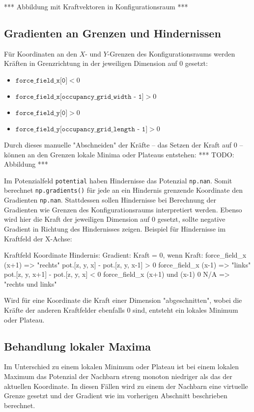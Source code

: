 *** Abbildung mit Kraftvektoren in Konfigurationsraum ***


\subsection{Gradienten an Grenzen und Hindernissen}

Für Koordinaten an den $X$- und $Y$-Grenzen des Konfigurationsraums werden Kräften in Grenzrichtung in der jeweiligen Dimension auf $0$ gesetzt:
\begin{itemize}
\item $\texttt{force\_field\_x[0]} < 0$
\item $\texttt{force\_field\_x[occupancy\_grid\_width - 1]} > 0$
\item $\texttt{force\_field\_y[0]} > 0$
\item $\texttt{force\_field\_y[occupancy\_grid\_length - 1]} > 0$
\end{itemize}

Durch dieses manuelle "Abschneiden" der Kräfte -- das Setzen der Kraft auf $0$ -- können an den Grenzen lokale Minima oder Plateaus entstehen:
	*** TODO: Abbildung ***

Im Potenzialfeld \texttt{potential} haben Hindernisse das Potenzial \texttt{np.nan}. Somit berechnet \texttt{np.gradients()} für jede an ein Hindernis grenzende Koordinate den Gradienten \texttt{np.nan}.
Stattdessen sollen Hindernisse bei Berechnung der Gradienten wie Grenzen des Konfigurationsraums interpretiert werden. Ebenso wird hier die Kraft der jeweiligen Dimension auf 0 gesetzt, sollte negative Gradient in Richtung des Hindernisses zeigen. Beispiel für Hindernisse im Kraftfeld der X-Achse:

Kraftfeld			Koordinate Hindernis:	Gradient: 								Kraft = 0, wenn Kraft:
force\_field\_x		(x+1) => "rechts"		pot.[z, y, x] - pot.[z, y, x-1]			> 0
force\_field\_x		(x-1) => "links"		pot.[z, y, x+1] - pot.[z, y, x]			< 0
force\_field\_x		(x+1) und (x-1)			0										N/A
					=> "rechts und links"

Wird für eine Koordinate die Kraft einer Dimension "abgeschnitten", wobei die Kräfte der anderen Kraftfelder ebenfalls $0$ sind, entsteht ein lokales Minimum oder Plateau.


\subsection{Behandlung lokaler Maxima}

Im Unterschied zu einem lokalen Minimum oder Plateau ist bei einem lokalen Maximum das Potenzial der Nachbarn streng monoton niedriger als das der aktuellen Koordinate.
In diesen Fällen wird zu einem der Nachbarn eine virtuelle Grenze gesetzt und der Gradient wie im vorherigen Abschnitt beschrieben berechnet.


